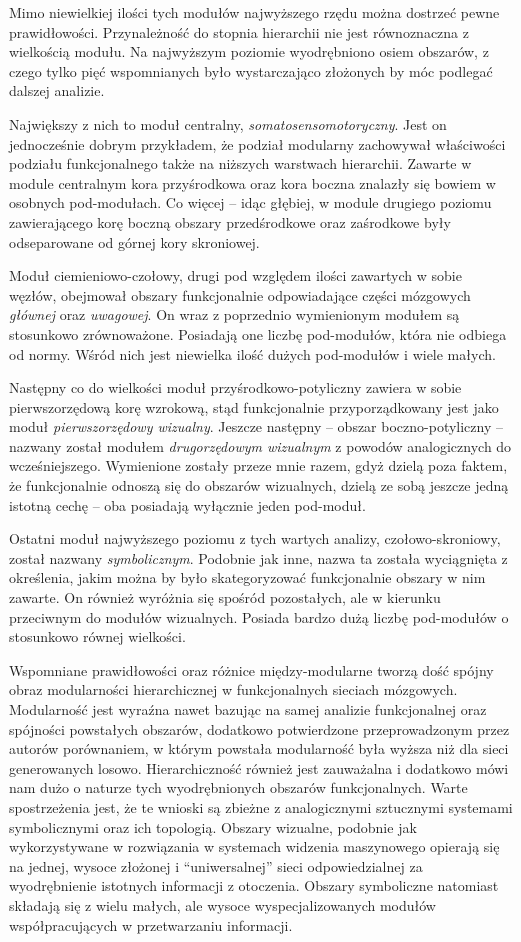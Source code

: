 Mimo niewielkiej ilości tych modułów najwyższego rzędu można dostrzeć pewne prawidłowości.
Przynależność do stopnia hierarchii nie jest równoznaczna z wielkością modułu.
Na najwyższym poziomie wyodrębniono osiem obszarów, z czego tylko pięć wspomnianych było wystarczająco złożonych by móc podlegać dalszej analizie.

Największy z nich to moduł centralny, \emph{somatosensomotoryczny}.
Jest on jednocześnie dobrym przykładem, że podział modularny zachowywał właściwości podziału funkcjonalnego także na niższych warstwach hierarchii.
Zawarte w module centralnym kora przyśrodkowa oraz kora boczna znalazły się bowiem w osobnych pod-modułach.
Co więcej -- idąc głębiej, w module drugiego poziomu zawierającego korę boczną obszary przedśrodkowe oraz zaśrodkowe były odseparowane od górnej kory skroniowej.

Moduł ciemieniowo-czołowy, drugi pod względem ilości zawartych w sobie węzłów, obejmował obszary funkcjonalnie odpowiadające części mózgowych \emph{głównej} oraz \emph{uwagowej}.
On wraz z poprzednio wymienionym modułem są stosunkowo zrównoważone.
Posiadają one liczbę pod-modułów, która nie odbiega od normy.
Wśród nich jest niewielka ilość dużych pod-modułów i wiele małych.

Następny co do wielkości moduł przyśrodkowo-potyliczny zawiera w sobie pierwszorzędową korę wzrokową, stąd funkcjonalnie przyporządkowany jest jako moduł \emph{pierwszorzędowy wizualny}.
Jeszcze następny -- obszar boczno-potyliczny -- nazwany został modułem \emph{drugorzędowym wizualnym} z powodów analogicznych do wcześniejszego.
Wymienione zostały przeze mnie razem, gdyż dzielą poza faktem, że funkcjonalnie odnoszą się do obszarów wizualnych, dzielą ze sobą jeszcze jedną istotną cechę -- oba posiadają wyłącznie jeden pod-moduł.

Ostatni moduł najwyższego poziomu z tych wartych analizy, czołowo-skroniowy, został nazwany \emph{symbolicznym}.
Podobnie jak inne, nazwa ta została wyciągnięta z określenia, jakim można by było skategoryzować funkcjonalnie obszary w nim zawarte.
On również wyróżnia się spośród pozostałych, ale w kierunku przeciwnym do modułów wizualnych.
Posiada bardzo dużą liczbę pod-modułów o stosunkowo równej wielkości.

Wspomniane prawidłowości oraz różnice między-modularne tworzą dość spójny obraz modularności hierarchicznej w funkcjonalnych sieciach mózgowych.
Modularność jest wyraźna nawet bazując na samej analizie funkcjonalnej oraz spójności powstałych obszarów, dodatkowo potwierdzone przeprowadzonym przez autorów porównaniem, w którym powstała modularność była wyższa niż dla sieci generowanych losowo.
Hierarchiczność również jest zauważalna i dodatkowo mówi nam dużo o naturze tych wyodrębnionych obszarów funkcjonalnych.
Warte spostrzeżenia jest, że te wnioski są zbieżne z analogicznymi sztucznymi systemami symbolicznymi oraz ich topologią.
Obszary wizualne, podobnie jak wykorzystywane w rozwiązania w systemach widzenia maszynowego opierają się na jednej, wysoce złożonej i ``uniwersalnej'' sieci odpowiedzialnej za wyodrębnienie istotnych informacji z otoczenia.
Obszary symboliczne natomiast składają się z wielu małych, ale wysoce wyspecjalizowanych modułów współpracujących w przetwarzaniu informacji.
